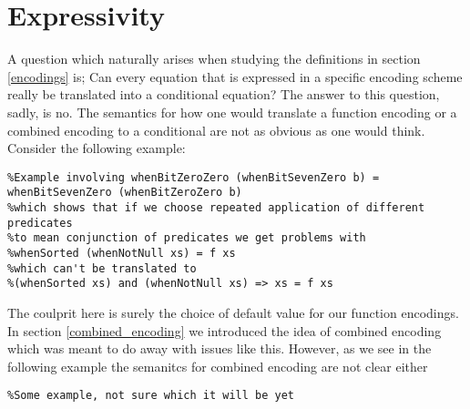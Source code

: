 \section{Expressivity}

A question which naturally arises when studying the
definitions in section \ref{encodings} is;
Can every equation that is expressed in a specific encoding
scheme really be translated into a conditional equation?
The answer to this question, sadly, is no. The semantics
for how one would translate a function encoding or a combined
encoding to a conditional are not as obvious as one would think.
Consider the following example:
\begin{verbatim}
%Example involving whenBitZeroZero (whenBitSevenZero b) = whenBitSevenZero (whenBitZeroZero b)
%which shows that if we choose repeated application of different predicates
%to mean conjunction of predicates we get problems with
%whenSorted (whenNotNull xs) = f xs
%which can't be translated to
%(whenSorted xs) and (whenNotNull xs) => xs = f xs
\end{verbatim}

The coulprit here is surely the choice of default value for our function encodings. 
In section \ref{combined_encoding} we introduced the idea of combined encoding which was meant to do away
with issues like this. However, as we see in the following example
the semanitcs for combined encoding are not clear either
\begin{verbatim}
%Some example, not sure which it will be yet
\end{verbatim}
